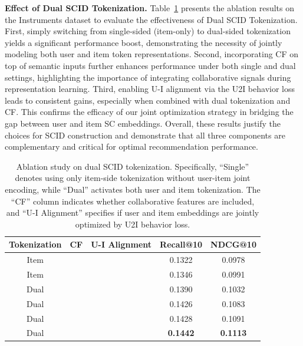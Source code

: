 \documentclass[letterpaper]{article} %
\newcommand{\cmark}{\ding{51}}
\newcommand{\xmark}{\ding{55}}
\begin{document}
%
\textbf{Effect of Dual SCID Tokenization.}
Table~\ref{tab:token} presents the ablation results on the Instruments dataset to evaluate the effectiveness of Dual SCID Tokenization.
First, simply switching from single-sided (item-only) to dual-sided tokenization yields a significant performance boost, demonstrating the necessity of jointly modeling both user and item token representations.
%
Second, incorporating CF on top of semantic inputs further enhances performance under both single and dual settings, highlighting the importance of integrating collaborative signals during representation learning.
%
Third, enabling U-I alignment via the U2I behavior loss leads to consistent gains, especially when combined with dual tokenization and CF.
%
This confirms the efficacy of our joint optimization strategy in bridging the gap between user and item SC embeddings.
%
Overall, these results justify the choices for SCID construction and demonstrate that all three components are complementary and critical for optimal recommendation performance.
%

%
\begin{table}[h]
\begin{center}
\small
\setlength{\tabcolsep}{4pt}
\begin{tabular}{ccc|cc}
\toprule
\textbf{Tokenization} & \textbf{CF} & \textbf{U-I Alignment} & \textbf{Recall@10} & \textbf{NDCG@10} \\
\midrule
Item & \xmark   & \xmark & 0.1322 & 0.0978 \\
Item & \cmark   & \xmark & 0.1346 & 0.0991 \\
\midrule
Dual & \xmark   & \xmark & 0.1390 & 0.1032 \\
Dual & \xmark   & \cmark & 0.1426 & 0.1083 \\
Dual & \cmark   & \xmark & 0.1428 & 0.1091 \\
Dual & \cmark   & \cmark & \textbf{0.1442} & \textbf{0.1113} \\
\bottomrule
\end{tabular}
\end{center}
\caption{Ablation study on dual SCID tokenization. Specifically, ``Single'' denotes using only item-side tokenization without user-item joint encoding, while ``Dual'' activates both user and item tokenization. The ``CF'' column indicates whether collaborative features are included, and ``U-I Alignment'' specifies if user and item embeddings are jointly optimized by U2I behavior loss.}
\label{tab:token}
\end{table}
%
\end{document}
